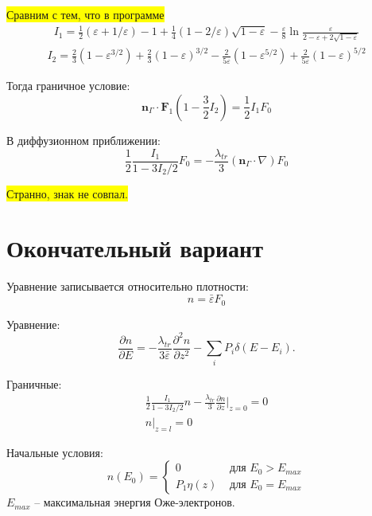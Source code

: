 \documentclass[a4paper,12pt]{article} %
\newcommand{\dff}[2]{\frac{\partial #1}{\partial #2}}
\newcommand{\dfn}[3]{\frac{\partial^#1 #2}{\partial #3^#1}}
\renewcommand{\vec}[1]{\bm{#1}}
\newcommand{\eps}{\varepsilon}
\begin{document}
\colorbox{yellow}{Сравним с тем, что в программе}
\begin{gather*}
I_1 =
\frac{1}{2} (\eps + 1/\eps) - 1 +
\frac{1}{4} (1 - 2/\eps)\sqrt{1 - \eps} -
\frac{\eps}{8} \ln \frac{\eps}{2 - \eps + 2 \sqrt{1 - \eps}}
\end{gather*}
\begin{gather*}
I_2 =
\frac{2}{3} (1 -\eps^{3/2})
+ \frac{2}{3} (1 -\eps)^{3/2}
- \frac{2}{5 \eps} (1 -\eps^{5/2})
+ \frac{2}{5 \eps} (1 -\eps)^{5/2}
\end{gather*}

Тогда граничное условие:
\begin{equation}
    \vec{n}_\Gamma \cdot \vec{F}_1 \left(1 - \frac{3}{2} I_2 \right) = \frac{1}{2} I_1 F_0
\end{equation}

В диффузионном приближении:
\begin{equation}
    \frac{1}{2} \frac{I_1}{1 - 3 I_2/2} F_0 = -\frac{\lambda_{tr}}{3}
    (\vec{n}_\Gamma \cdot \nabla) F_0
\end{equation}

\colorbox{yellow}{Странно, знак не совпал.}

\clearpage
\section{Окончательный вариант}

Уравнение записывается относительно плотности:
\begin{equation}
    n = \bar{\eps} F_0
\end{equation}


Уравнение:
\begin{equation}
    \dff{n}{E} = - \frac{\lambda_{tr}}{3\bar{\eps}}\dfn{2}{n}{z} - \sum_{i} P_i\delta(E - E_i).
\end{equation}

Граничные:
\begin{gather}
    \frac{1}{2} \frac{I_1}{1 - 3 I_2/2} n - \frac{\lambda_{tr}}{3} \dff{n}{z} \Bigg|_{z = 0} = 0 \\
    n\Bigg|_{z = l} = 0
\end{gather}

Начальные условия:
\begin{equation}
	n(E_0) = 
	\begin{cases}
		0 & \text{ для } E_0 > E_{max} \\
		P_1 \eta (z) & \text{ для } E_0 = E_{max}
	\end{cases}
\end{equation}
$E_{max}$ -- максимальная энергия Оже-электронов.
\end{document}
